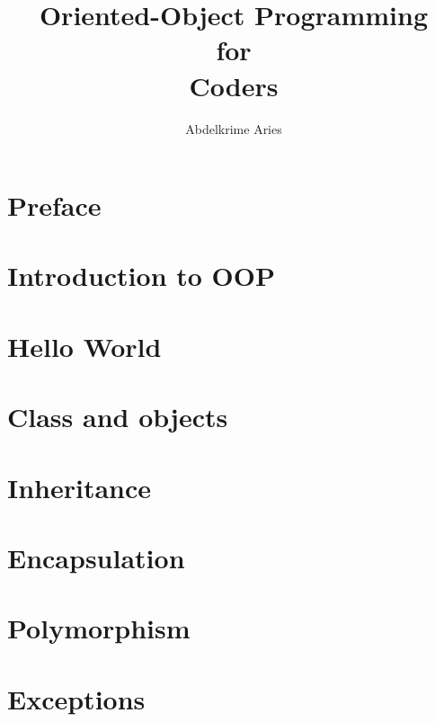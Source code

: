 \documentclass[12pt]{book}
\title{Oriented-Object Programming\\ for\\ Coders}
\author{Abdelkrime Aries}
\begin{document}
\maketitle



\chapter*{Preface}


\chapter{Introduction to OOP}


\chapter{Hello World}


\chapter{Class and objects}

\chapter{Inheritance}

\chapter{Encapsulation}

\chapter{Polymorphism}

\chapter{Exceptions}
\end{document}
